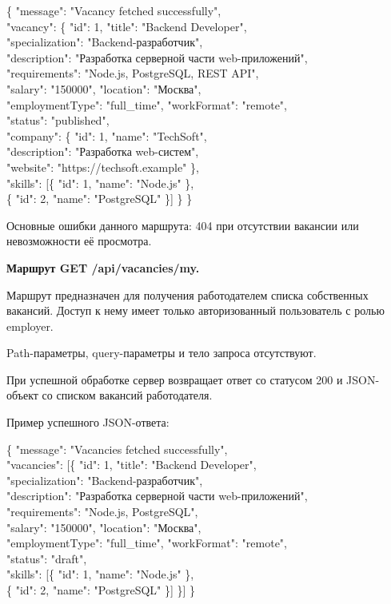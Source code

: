\begin{flushleft}
	\small\ttfamily
	\{ "message": "Vacancy fetched successfully",\\
	"vacancy": \{ "id": 1, "title": "Backend Developer",\\
	"specialization": "Backend-разработчик",\\
	"description": "Разработка серверной части web-приложений",\\
	"requirements": "Node.js, PostgreSQL, REST API",\\
	"salary": "150000", "location": "Москва",\\
	"employmentType": "full\_time", "workFormat": "remote",\\
	"status": "published",\\
	"company": \{ "id": 1, "name": "TechSoft",\\
	"description": "Разработка web-систем",\\
	"website": "https://techsoft.example" \},\\
	"skills": [\{ "id": 1, "name": "Node.js" \},\\
	\{ "id": 2, "name": "PostgreSQL" \}] \} \}
\end{flushleft}

Основные ошибки данного маршрута: 404 при отсутствии вакансии или невозможности её просмотра.

\textbf{Маршрут GET /api/vacancies/my.}

Маршрут предназначен для получения работодателем списка собственных вакансий. Доступ к нему имеет только авторизованный пользователь с ролью employer.

Path-параметры, query-параметры и тело запроса отсутствуют.

При успешной обработке сервер возвращает ответ со статусом 200 и JSON-объект со списком вакансий работодателя.

Пример успешного JSON-ответа:

\begin{flushleft}
	\small\ttfamily
	\{ "message": "Vacancies fetched successfully",\\
	"vacancies": [\{ "id": 1, "title": "Backend Developer",\\
	"specialization": "Backend-разработчик",\\
	"description": "Разработка серверной части web-приложений",\\
	"requirements": "Node.js, PostgreSQL",\\
	"salary": "150000", "location": "Москва",\\
	"employmentType": "full\_time", "workFormat": "remote",\\
	"status": "draft",\\
	"skills": [\{ "id": 1, "name": "Node.js" \},\\
	\{ "id": 2, "name": "PostgreSQL" \}] \}] \}
\end{flushleft}

